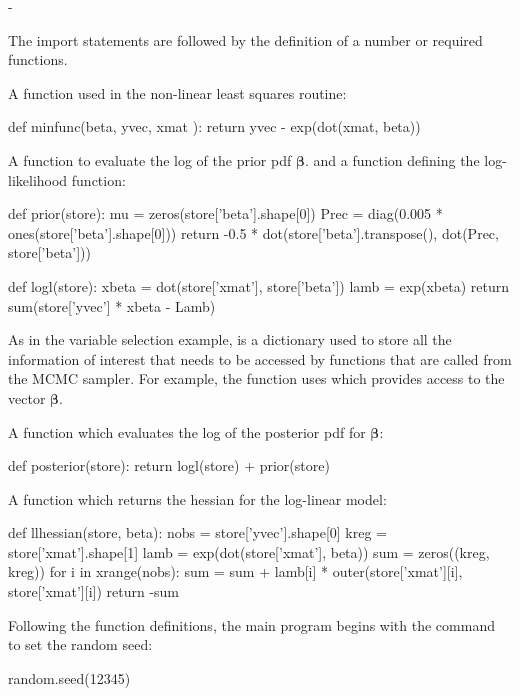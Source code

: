 -\documentclass[article]{jss}
\begin{document}
The import statements are followed by the definition of a number or
required functions.

A function  used in the non-linear least squares routine:
\begin{Code}
def minfunc(beta, yvec, xmat ):
    return yvec - exp(dot(xmat, beta))
\end{Code}

A function  to evaluate the log of the prior pdf
$\bm{\beta}.$ and a function  defining the log-likelihood
function:

\begin{Code}
def prior(store):
    mu = zeros(store['beta'].shape[0])
    Prec = diag(0.005 * ones(store['beta'].shape[0]))
    return -0.5 * dot(store['beta'].transpose(), dot(Prec, store['beta']))

def logl(store):
    xbeta = dot(store['xmat'], store['beta'])
    lamb = exp(xbeta)
    return sum(store['yvec'] * xbeta - Lamb)
\end{Code}

As in the variable selection example,  is a
 dictionary used to store all the information of
interest that needs to be accessed by functions that are called from
the MCMC sampler. For example, the function  uses
 which provides access to the vector $\bm{\beta}.$


A function  which evaluates the log
of the posterior pdf for $\bm{\beta}$:

\begin{Code}
def posterior(store):
    return logl(store) + prior(store)
\end{Code}

A function  which returns the hessian for the
log-linear model:

\begin{Code}
def llhessian(store, beta):
    nobs = store['yvec'].shape[0]
    kreg = store['xmat'].shape[1]
    lamb = exp(dot(store['xmat'], beta))
    sum = zeros((kreg, kreg))
    for i in xrange(nobs):
        sum = sum + lamb[i] * outer(store['xmat'][i], store['xmat'][i])
    return -sum
\end{Code}

Following the function definitions, the main program begins with the
command to set the random seed:
\begin{Code}
random.seed(12345)      
\end{Code}
\end{document}
